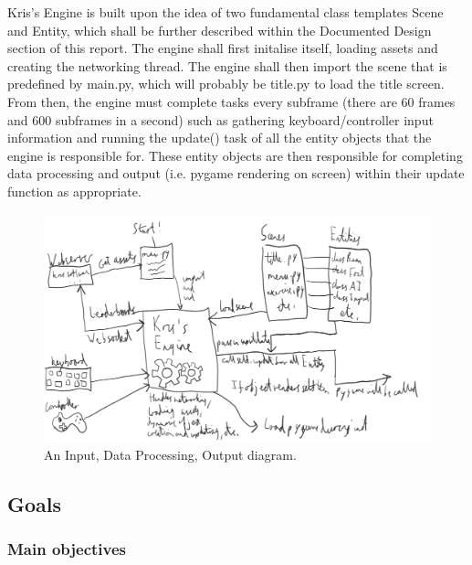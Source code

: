 \documentclass{article}
\begin{document}
Kris's Engine is built upon the idea of two fundamental class templates Scene and Entity, which shall be further described within the Documented Design section of this report. The engine shall first initalise itself, loading assets and creating the networking thread. The engine shall then import the scene that is predefined by main.py, which will probably be title.py to load the title screen. From then, the engine must complete tasks every subframe (there are 60 frames and 600 subframes in a second) such as gathering keyboard/controller input information and running the update() task of all the entity objects that the engine is responsible for. These entity objects are then responsible for completing data processing and output (i.e. pygame rendering on screen) within their update function as appropriate.

\begin{figure}[h]
\centering
\includegraphics[width=1\textwidth]{idpo.png}
\caption{\label{fig:idpo}An Input, Data Processing, Output diagram.}
\end{figure}

\subsection{Goals}

\subsubsection{Main objectives}
\end{document}

